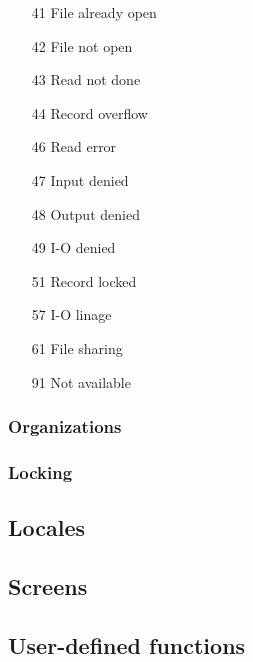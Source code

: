 \begin{enumerate}
\item[41] File already open
\item[42] File not open
\item[43] Read not done
\item[44] Record overflow
\item[46] Read error
\item[47] Input denied
\item[48] Output denied
\item[49] I-O denied
\end{enumerate}

\begin{enumerate}
\item[51] Record locked
\item[57] I-O linage
\end{enumerate}

\begin{enumerate}
\item[61] File sharing
\end{enumerate}

\begin{enumerate}
\item[91] Not available
\end{enumerate}

\subsubsection{Organizations}

\subsubsection{Locking}

\subsection{Locales}

\subsection{Screens}

\subsection{User-defined functions}

